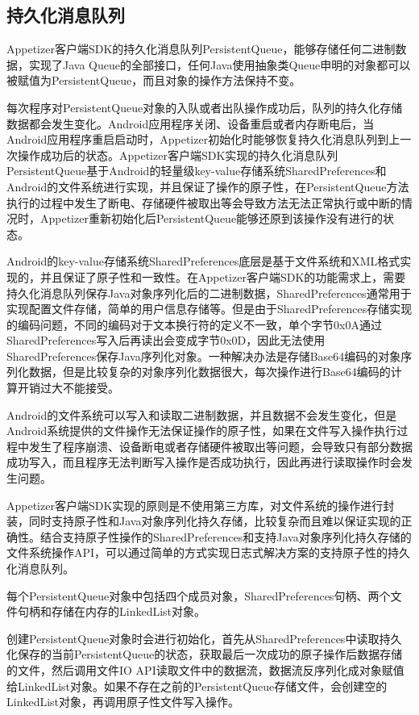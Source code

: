 \subsection{持久化消息队列}
\label{subsec:persistentQueue}

Appetizer客户端SDK的持久化消息队列PersistentQueue，能够存储任何二进制数据，实现了Java Queue的全部接口，任何Java使用抽象类Queue申明的对象都可以被赋值为PersistentQueue，而且对象的操作方法保持不变。

每次程序对PersistentQueue对象的入队或者出队操作成功后，队列的持久化存储数据都会发生变化。Android应用程序关闭、设备重启或者内存断电后，当Android应用程序重启启动时，Appetizer初始化时能够恢复持久化消息队列到上一次操作成功后的状态。Appetizer客户端SDK实现的持久化消息队列PersistentQueue基于Android的轻量级key-value存储系统SharedPreferences和Android的文件系统进行实现，并且保证了操作的原子性，在PersistentQueue方法执行的过程中发生了断电、存储硬件被取出等会导致方法无法正常执行或中断的情况时，Appetizer重新初始化后PersistentQueue能够还原到该操作没有进行的状态。

Android的key-value存储系统SharedPreferences底层是基于文件系统和XML格式实现的，并且保证了原子性和一致性。在Appetizer客户端SDK的功能需求上，需要持久化消息队列保存Java对象序列化后的二进制数据，SharedPreferences通常用于实现配置文件存储，简单的用户信息存储等。但是由于SharedPreferences存储实现的编码问题，不同的编码对于文本换行符的定义不一致，单个字节0x0A通过SharedPreferences写入后再读出会变成字节0x0D，因此无法使用SharedPreferences保存Java序列化对象。一种解决办法是存储Base64编码的对象序列化数据，但是比较复杂的对象序列化数据很大，每次操作进行Base64编码的计算开销过大不能接受。

Android的文件系统可以写入和读取二进制数据，并且数据不会发生变化，但是Android系统提供的文件操作无法保证操作的原子性，如果在文件写入操作执行过程中发生了程序崩溃、设备断电或者存储硬件被取出等问题，会导致只有部分数据成功写入，而且程序无法判断写入操作是否成功执行，因此再进行读取操作时会发生问题。

Appetizer客户端SDK实现的原则是不使用第三方库，对文件系统的操作进行封装，同时支持原子性和Java对象序列化持久存储，比较复杂而且难以保证实现的正确性。结合支持原子性操作的SharedPreferences和支持Java对象序列化持久存储的文件系统操作API，可以通过简单的方式实现日志式解决方案的支持原子性的持久化消息队列。


每个PersistentQueue对象中包括四个成员对象，SharedPreferences句柄、两个文件句柄和存储在内存的LinkedList对象。

创建PersistentQueue对象时会进行初始化，首先从SharedPreferences中读取持久化保存的当前PersistentQueue的状态，获取最后一次成功的原子操作后数据存储的文件，然后调用文件IO API读取文件中的数据流，数据流反序列化成对象赋值给LinkedList对象。如果不存在之前的PersistentQueue存储文件，会创建空的LinkedList对象，再调用原子性文件写入操作。


